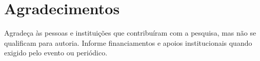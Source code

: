 \documentclass[12pt]{article}
\begin{document}
\section*{Agradecimentos}
\label{sec:agradecimentos}

Agradeça às pessoas e instituições que contribuíram com a pesquisa, mas não se qualificam para autoria. Informe financiamentos e apoios institucionais quando exigido pelo evento ou periódico.

%
%



\end{document}
